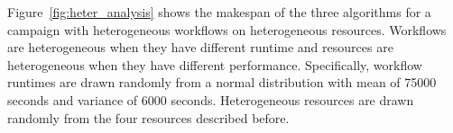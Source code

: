 

Figure~\ref{fig:heter_analysis} shows the makespan of the three algorithms for
a campaign with heterogeneous workflows on heterogeneous resources. Workflows
are heterogeneous when they have different runtime and resources are
heterogeneous when they have different performance. Specifically, workflow
runtimes are drawn randomly from a normal distribution with mean of 75000
seconds and variance of 6000 seconds. Heterogeneous resources are drawn
randomly from the four resources described before.

